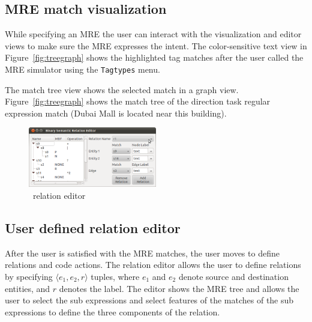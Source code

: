 \subsection{MRE match visualization}

While specifying an MRE the user can interact with the visualization and editor views
to make sure the MRE expresses the intent. 
The color-sensitive text view in Figure~\ref{fig:treegraph} shows 
the highlighted tag matches after the user called the MRE simulator using 
the {\tt Tagtypes} menu. 

The match tree view shows the selected match in a graph view.
%
Figure~\ref{fig:treegraph} shows the match tree of the direction task 
regular expression match 
(Dubai Mall is located near this building). 

\begin{figure}[tb]
  \centering
  \includegraphics[width=0.5\textwidth]{figures/merfsreditor.png}
\caption{\framework~relation editor}
  \label{fig:relationeditor}
  \vspace{-1em}
\end{figure}

\subsection{User defined relation editor}

After the user is satisfied with the MRE matches, 
the user moves to define relations and code actions. 
The relation editor allows the user to define relations 
by specifying $\langle e_1,e_2,r\rangle$ tuples, 
where $e_1$ and $e_2$ denote source and destination entities, and $r$ denotes 
the label.
The editor shows the MRE tree and allows the user to select the sub 
expressions and select features 
of the matches of the sub expressions to define the three components of the relation. 

